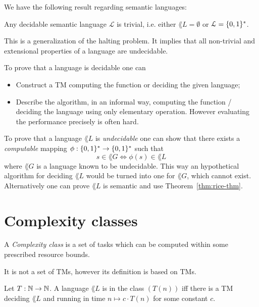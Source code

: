 We have the following result regarding semantic languages:
\begin{theorem}
	Any decidable semantic language \(\mathcal{L}\) is trivial, i.e. either $\lang{L} = \emptyset$ or $\mathcal{L} = \{ 0,1 \}^* $.
	\label{thm:rice-thm}
\end{theorem}
\begin{remark}
	This is a generalization of the halting problem. It implies that all non-trivial and extensional properties of a language are undecidable.
\end{remark}

To prove that a language is decidable one can
\begin{itemize}[noitemsep,topsep=0pt,parsep=0pt,partopsep=0pt]
	\item Construct a TM computing the function or deciding the given language;
	\item Describe the algorithm, in an informal way, computing the function / deciding the language using only elementary operation. However evaluating the performance precisely is often hard.
\end{itemize}

To prove that a language $\lang{L}$ is \emph{undecidable} one can show that there exists a \emph{computable} mapping $\phi : \{ 0,1 \}^*  \to \{ 0,1 \}^* $ such that
\[
	s \in \lang{G} \iff \phi(s) \in \lang{L}
\]
where $\lang{G}$ is a language known to be undecidable.
This way an hypothetical algorithm for deciding $\lang{L}$ would be turned into one for $\lang{G}$, which cannot exist.
Alternatively one can prove $\lang{L}$ is semantic and use Theorem~\ref{thm:rice-thm}.


\section{Complexity classes}

\begin{definition}
	A \emph{Complexity class} is a set of tasks which can be computed within some prescribed resource bounds.
	\label{def:complexity-class}
\end{definition}
It is not a set of TMs, however its definition is based on TMs.
\begin{definition}
	Let $T : \mathbb{N} \to \mathbb{N}$. A language $\lang{L}$ is in the class \DTIME$(T(n))$ iff there is a TM deciding $\lang{L}$ and running in time $n \mapsto c \cdot T(n)$ for some constant $c$.
	\label{def:dtime-class}
\end{definition}

